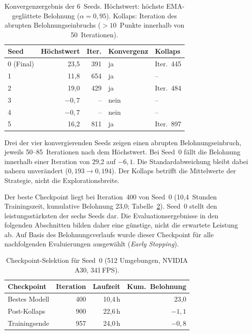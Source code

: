 \begin{table}[H]
  \centering
  \caption[Konvergenzergebnis der 6~Trainingsseeds]{Konvergenzergebnis
  der 6~Seeds. Höchstwert: höchste EMA-geglättete Belohnung
  ($\alpha = 0{,}95$). Kollaps: Iteration des abrupten
  Belohnungseinbruchs ($> 10$~Punkte innerhalb von 50~Iterationen).}
  \label{tab:seed_classification}
  \small
  \renewcommand{\arraystretch}{1.1}
  \begin{tabular}{l r r l l}
    \toprule
    \textbf{Seed} & \textbf{Höchstwert} & \textbf{Iter.}
      & \textbf{Konvergenz} & \textbf{Kollaps} \\
    \midrule
    0 (Final) & 23,5 & 391 & ja & Iter.\ 445 \\
    1         & 11,8 & 654 & ja & -- \\
    2         & 19,0 & 429 & ja & Iter.\ 484 \\
    3         & $-0{,}7$ & -- & nein & -- \\
    4         & $-0{,}7$ & -- & nein & -- \\
    5         & 16,2 & 811 & ja & Iter.\ 897 \\
    \bottomrule
  \end{tabular}
\end{table}


Drei der vier konvergierenden Seeds zeigen einen abrupten
Belohnungseinbruch, jeweils 50--85~Iterationen nach dem Höchstwert. Bei Seed~0
fällt die Belohnung innerhalb einer Iteration von 29,2 auf $-6{,}1$.
Die Standardabweichung bleibt dabei nahezu unverändert ($0{,}193
\rightarrow 0{,}194$). Der Kollaps betrifft die Mittelwerte der
Strategie, nicht die Explorationsbreite.

Der beste Checkpoint liegt bei Iteration~400 von Seed~0 (10,4~Stunden
Trainingszeit, kumulative Belohnung 23,0; Tabelle~\ref{tab:konvergenz}). Seed~0 stellt den
leistungsstärksten der sechs Seeds dar. Die Evaluationsergebnisse in den
folgenden Abschnitten bilden daher eine günstige, nicht die erwartete
Leistung ab. Auf Basis des Belohnungsverlaufs wurde dieser Checkpoint
für alle nachfolgenden Evaluierungen ausgewählt (\textit{Early Stopping}).

\begin{table}[H]
  \centering
  \caption[Checkpoint-Selektion]{Checkpoint-Selektion für Seed~0
  (512 Umgebungen, NVIDIA A30, 341\,FPS).}
  \label{tab:konvergenz}
  \small
  \renewcommand{\arraystretch}{1.1}
  \begin{tabular}{l r r r}
    \toprule
    \textbf{Checkpoint} & \textbf{Iteration} & \textbf{Laufzeit} & \textbf{Kum.\ Belohnung} \\
    \midrule
    Bestes Modell   & 400 & 10,4\,h & 23,0 \\
    Post-Kollaps    & 900 & 22,6\,h & $-1{,}1$ \\
    Trainingsende   & 957 & 24,0\,h & $-0{,}8$ \\
    \bottomrule
  \end{tabular}
\end{table}


